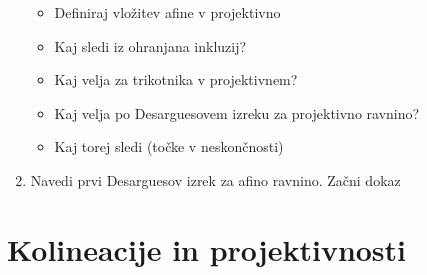 \documentclass{article}
\begin{document}
\begin{enumerate}
\begin{itemize}
            \item Definiraj vložitev afine v projektivno
            \item Kaj sledi iz ohranjana inkluzij?
            \item Kaj velja za trikotnika v projektivnem?
            \item Kaj velja po Desarguesovem izreku za projektivno ravnino?
            \item Kaj torej sledi (točke v neskončnosti)
        \end{itemize}
        \item Navedi prvi Desarguesov izrek za afino ravnino. Začni dokaz
    \end{enumerate} 

    \section{Kolineacije in projektivnosti}
\end{document}
